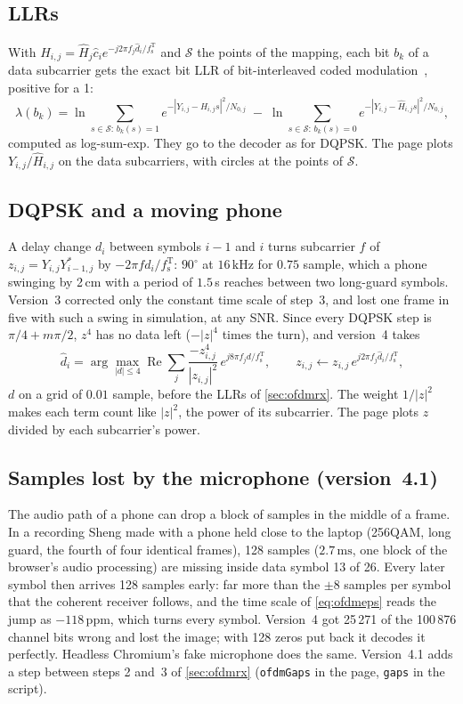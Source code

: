 \documentclass[11pt,a4paper]{article}
\newcommand{\kHz}{\,\mathrm{kHz}}
\newcommand{\ms}{\,\mathrm{ms}}
\newcommand{\code}[1]{\texttt{#1}}
\newcommand{\fsT}{f_{\mathrm{s}}^{\mathrm{T}}}
\theoremstyle{remark}
\begin{document}
\subsection{LLRs}
With $\hat H_{i,j} = \hat H_j \hat c_i e^{-j2\pi f_j \hat d_i/\fsT}$ and $\mathcal S$ the points of the mapping, each bit $b_k$ of a data subcarrier gets the exact bit LLR of bit-interleaved coded modulation~\cite{bicm}, positive for a 1:
\begin{equation}
\lambda(b_k) = \ln \sum_{s \in \mathcal S:\, b_k(s) = 1} e^{-|Y_{i,j} - \hat H_{i,j} s|^2/N_{0,j}} \;-\; \ln \sum_{s \in \mathcal S:\, b_k(s) = 0} e^{-|Y_{i,j} - \hat H_{i,j} s|^2/N_{0,j}},
\end{equation}
computed as log-sum-exp. They go to the decoder as for DQPSK. The page plots $Y_{i,j}/\hat H_{i,j}$ on the data subcarriers, with circles at the points of $\mathcal S$.

\subsection{DQPSK and a moving phone}
\label{sec:dqpsktrack}
A delay change $d_i$ between symbols $i - 1$ and $i$ turns subcarrier $f$ of $z_{i,j} = Y_{i,j}Y_{i-1,j}^*$ by $-2\pi f d_i/\fsT$: $90^\circ$ at $16\kHz$ for $0.75$ sample, which a phone swinging by 2\,cm with a period of $1.5$\,s reaches between two long-guard symbols. Version~3 corrected only the constant time scale of step~3, and lost one frame in five with such a swing in simulation, at any SNR. Since every DQPSK step is $\pi/4 + m\pi/2$, $z^4$ has no data left ($-|z|^4$ times the turn), and version~4 takes
\begin{equation}
\hat d_i = \arg\max_{|d| \le 4} \operatorname{Re} \sum_j \frac{-z_{i,j}^4}{|z_{i,j}|^2}\, e^{j 8\pi f_j d/\fsT}, \qquad z_{i,j} \leftarrow z_{i,j}\, e^{j2\pi f_j \hat d_i/\fsT},
\label{eq:dqpsktrack}
\end{equation}
$d$ on a grid of $0.01$ sample, before the LLRs of \cref{sec:ofdmrx}. The weight $1/|z|^2$ makes each term count like $|z|^2$, the power of its subcarrier. The page plots $z$ divided by each subcarrier's power.

\subsection{Samples lost by the microphone (version~4.1)}
\label{sec:gaps}
The audio path of a phone can drop a block of samples in the middle of a frame. In a recording Sheng made with a phone held close to the laptop (256QAM, long guard, the fourth of four identical frames), 128 samples ($2.7\ms$, one block of the browser's audio processing) are missing inside data symbol 13 of 26. Every later symbol then arrives 128 samples early: far more than the $\pm 8$ samples per symbol that the coherent receiver follows, and the time scale of \cref{eq:ofdmeps} reads the jump as $-118$\,ppm, which turns every symbol. Version~4 got 25\,271 of the 100\,876 channel bits wrong and lost the image; with 128 zeros put back it decodes it perfectly. Headless Chromium's fake microphone does the same. Version~4.1 adds a step between steps 2 and~3 of \cref{sec:ofdmrx} (\code{ofdmGaps} in the page, \code{gaps} in the script).
\end{document}
